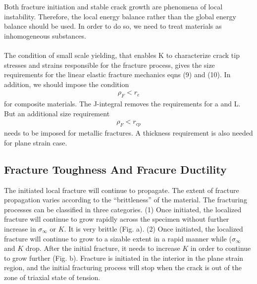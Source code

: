 \documentclass[12pt]{article}
\begin{document}
Both fracture initiation and stable crack growth are phenomena of local instability. Therefore, the
local energy balance rather than the global energy balance should be used. In order to do so, we need to
treat materials as inhomogeneous substances.
\\\\
The condition of small scale yielding, that enables K to characterize crack tip stresses and strains
responsible for the fracture process, gives the size requirements for the linear elastic fracture mechanics
eqns (9) and (10). In addition, we should impose the condition
\begin{align*}
    \rho_F < r_e \tag{11} \label{11}
\end{align*}
for composite materials. The J-integral removes the requirements for a and L. But an additional size
requirement
\begin{align*}
    \rho_F < r_{cp} \tag{12} \label{12}
\end{align*}
needs to be imposed for metallic fractures. A thickness requirement is also needed for plane strain case.
\subsection{Fracture Toughness And Fracure Ductility}
The initiated local fracture will continue to propagate. The extent of fracture propagation varies
according to the “brittleness” of the material. The fracturing processes can be classified in three
categories.
(1) Once initiated, the localized fracture will continue to grow rapidly across the specimen without
further increase in $\sigma_\infty$ or $K$. It is very brittle (Fig. a).
(2) Once initiated, the localized fracture will continue to grow to a sizable extent in a rapid manner
while ($\sigma_\infty$ and $K$ drop. After the initial fracture, it needs to increase $K$ in order to continue to grow
further (Fig. b).
Fracture is initiated in the interior in the plane strain region, and the initial fracturing process will
stop when the crack is out of the zone of triaxial state of tension.
\end{document}
